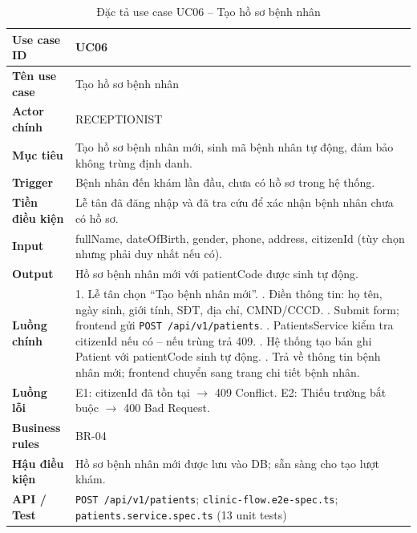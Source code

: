 \begin{table}[H]
\centering
\caption{Đặc tả use case UC06 -- Tạo hồ sơ bệnh nhân}
\label{tab:uc06}
\begin{tabularx}{\textwidth}{|p{3.6cm}|X|}
\hline
\textbf{Use case ID} & UC06 \\
\hline
\textbf{Tên use case} & Tạo hồ sơ bệnh nhân \\
\hline
\textbf{Actor chính} & RECEPTIONIST \\
\hline
\textbf{Mục tiêu} & Tạo hồ sơ bệnh nhân mới, sinh mã bệnh nhân tự động, đảm bảo không trùng định danh. \\
\hline
\textbf{Trigger} & Bệnh nhân đến khám lần đầu, chưa có hồ sơ trong hệ thống. \\
\hline
\textbf{Tiền điều kiện} & Lễ tân đã đăng nhập và đã tra cứu để xác nhận bệnh nhân chưa có hồ sơ. \\
\hline
\textbf{Input} & fullName, dateOfBirth, gender, phone, address, citizenId (tùy chọn nhưng phải duy nhất nếu có). \\
\hline
\textbf{Output} & Hồ sơ bệnh nhân mới với patientCode được sinh tự động. \\
\hline
\textbf{Luồng chính} &
1. Lễ tân chọn ``Tạo bệnh nhân mới''. \newline
2. Điền thông tin: họ tên, ngày sinh, giới tính, SĐT, địa chỉ, CMND/CCCD. \newline
3. Submit form; frontend gửi \texttt{POST /api/v1/patients}. \newline
4. PatientsService kiểm tra citizenId nếu có -- nếu trùng trả 409. \newline
5. Hệ thống tạo bản ghi Patient với patientCode sinh tự động. \newline
6. Trả về thông tin bệnh nhân mới; frontend chuyển sang trang chi tiết bệnh nhân. \\
\hline
\textbf{Luồng lỗi} & E1: citizenId đã tồn tại $\rightarrow$ 409 Conflict. E2: Thiếu trường bắt buộc $\rightarrow$ 400 Bad Request. \\
\hline
\textbf{Business rules} & BR-04 \\
\hline
\textbf{Hậu điều kiện} & Hồ sơ bệnh nhân mới được lưu vào DB; sẵn sàng cho tạo lượt khám. \\
\hline
\textbf{API / Test} & \texttt{POST /api/v1/patients}; \texttt{clinic-flow.e2e-spec.ts}; \texttt{patients.service.spec.ts} (13 unit tests) \\
\hline
\end{tabularx}
\end{table}

